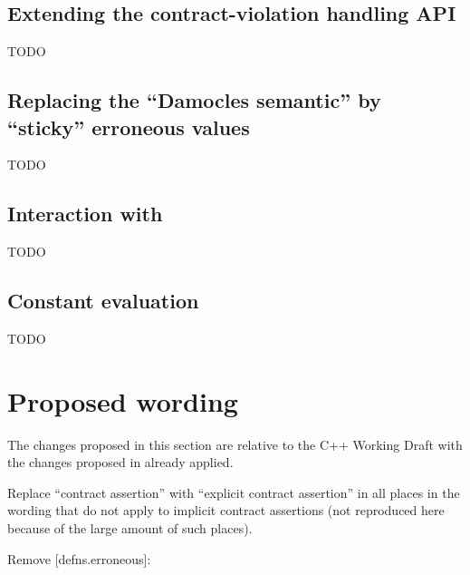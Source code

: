\subsection{Extending the contract-violation handling API}

TODO


\subsection{Replacing the ``Damocles semantic'' by ``sticky'' erroneous values}

TODO


\subsection{Interaction with }

TODO

\subsection{Constant evaluation}

TODO


\section{Proposed wording}

The changes proposed in this section are relative to the C++ Working Draft \cite{N5001} with the changes proposed in \cite{P2900R13} already applied.

Replace ``contract assertion'' with ``explicit contract assertion'' in all places in the wording that do not apply to implicit contract assertions (not reproduced here because of the large amount of such places).

Remove [defns.erroneous]:

\begin{adjustwidth}{0.5cm}{0.5cm}


\end{adjustwidth}

